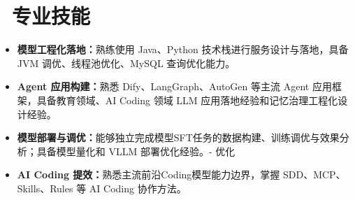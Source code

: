 \documentclass{resume}
\newcommand{\lead}[1]{\textbf{#1}}
\begin{document}
\section{\faCogs\ 专业技能}
\begin{itemize}[parsep=0.08em]
  \item \lead{模型工程化落地：}熟练使用 Java、Python 技术栈进行服务设计与落地，具备 JVM 调优、线程池优化、MySQL 查询优化能力。
  \item \lead{Agent 应用构建：}熟悉 Dify、LangGraph、AutoGen 等主流 Agent 应用框架，具备教育领域、AI Coding 领域 LLM 应用落地经验和记忆治理工程化设计经验。
  \item \lead{模型部署与调优：}能够独立完成模型SFT任务的数据构建、训练调优与效果分析；具备模型量化和 VLLM 部署优化经验。- 优化
  \item \lead{AI Coding 提效：}熟悉主流前沿Coding模型能力边界，掌握 SDD、MCP、Skills、Rules 等 AI Coding 协作方法。
\end{itemize}
\end{document}
